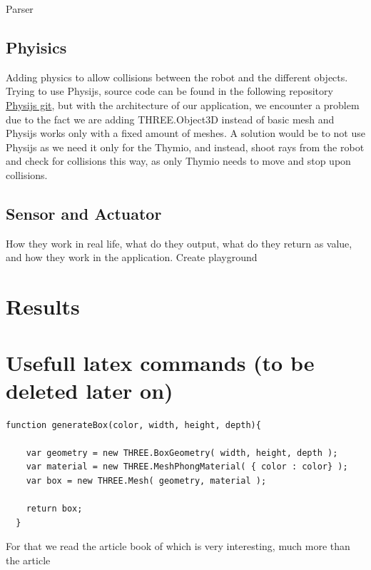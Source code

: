 \documentclass{scrartcl}
\begin{document}
Parser


\subsection{Phyisics}

Adding physics to allow collisions between the robot and the different objects. Trying to use Physijs, source code can be found in the following repository \href{https://github.com/chandlerprall/Physijs/wiki/Basic-Setup}{Physijs git}, 
but with the architecture of our application, we encounter a problem due to the fact we are adding THREE.Object3D instead of basic mesh and Physijs works only with a fixed amount of meshes. A solution would be to not use Physijs as we need it only for the Thymio,
and instead, shoot rays from the robot and check for collisions this way, as only Thymio needs to move and stop upon collisions.

\subsection{Sensor and Actuator}
How they work in real life, what do they output, what do they return as value, and how they work in the application.
Create playground

\section{Results}



\section{Usefull latex commands (to be deleted later on)}
\lstset{language=JavaScript}
\begin{lstlisting}[basicstyle=\ttfamily\small]
  function generateBox(color, width, height, depth){

    var geometry = new THREE.BoxGeometry( width, height, depth );
    var material = new THREE.MeshPhongMaterial( { color : color} );
    var box = new THREE.Mesh( geometry, material );
                
    return box;
  }
\end{lstlisting}
For that we read the article book of \cite{Jerald:2015:VBH:2792790}
which is very interesting, much more than the article
\cite{Diniz:2017:UGO:3100317.3100324}
\end{document}
